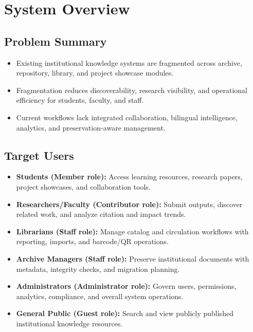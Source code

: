 \documentclass[12pt,a4paper]{article}
\begin{document}
\section{System Overview}

\subsection*{Problem Summary}
\begin{itemize}
    \item Existing institutional knowledge systems are fragmented across archive, repository, library, and project showcase modules.
    \item Fragmentation reduces discoverability, research visibility, and operational efficiency for students, faculty, and staff.
    \item Current workflows lack integrated collaboration, bilingual intelligence, analytics, and preservation-aware management.
\end{itemize}

\subsection*{Target Users}
\begin{itemize}
    \item \textbf{Students (Member role):} Access learning resources, research papers, project showcases, and collaboration tools.
    \item \textbf{Researchers/Faculty (Contributor role):} Submit outputs, discover related work, and analyze citation and impact trends.
    \item \textbf{Librarians (Staff role):} Manage catalog and circulation workflows with reporting, imports, and barcode/QR operations.
    \item \textbf{Archive Managers (Staff role):} Preserve institutional documents with metadata, integrity checks, and migration planning.
    \item \textbf{Administrators (Administrator role):} Govern users, permissions, analytics, compliance, and overall system operations.
    \item \textbf{General Public (Guest role):} Search and view publicly published institutional knowledge resources.
\end{itemize}
\end{document}
